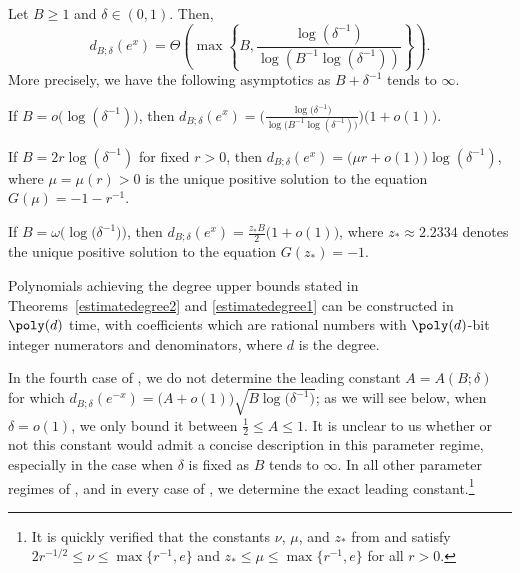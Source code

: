 \begin{theorem} 

\label{estimatedegree1}

Let $B \ge 1$ and $\delta \in (0, 1)$. Then,
$$d_{B; \delta} (e^{x}) = \Theta\left( \max \left\{ B, \frac{\log(\delta^{-1}) }{ \log(B^{-1} \log(\delta^{-1}))} \right\}\right).$$ More precisely, we have the following asymptotics as $B + \delta^{-1}$ tends to $\infty$.

\begin{enumerate}


{\item If $B = o \big( \log ( \delta^{-1}) \big)$, then $d_{B; \delta} (e^x)  =  \bigg( \displaystyle\frac{\log \big( \delta^{-1} \big)}{\log \big( B^{-1} \log (\delta^{-1}) \big)} \bigg) \big( 1 + o (1) \big)$.}

{\item If $B = 2 r \log ( \delta^{-1})$ for fixed $r > 0$, then $d_{B; \delta} (e^x) = \big( \mu r + o(1) \big) \log (\delta^{-1})$, where $\mu = \mu (r) > 0$ is the unique positive solution to the equation $G (\mu) = -1 - r^{-1}$.}


{\item If $B = \omega \big( \log \big( \delta^{-1}) \big)$, then $d_{B; \delta} (e^x)  = \displaystyle\frac{z_*B}{2} \big( 1 + o(1) \big)$, where $z_* \approx 2.2334$ denotes the unique positive solution to the equation $G (z_*) = -1$.}

\end{enumerate}

\end{theorem} 




\begin{remark}
Polynomials achieving the degree upper bounds stated in Theorems~\ref{estimatedegree2} and \ref{estimatedegree1} can be constructed in $\poly(d)$ time, with coefficients which are rational numbers with $\poly(d)$-bit integer numerators and denominators, where $d$ is the degree.
\end{remark}

\begin{remark} \label{rem6}

In the fourth case of , we do not determine the leading constant $A = A(B; \delta)$ for which $d_{B; \delta} (e^{-x}) = \big( A + o(1) \big) \sqrt{B \log \big( \delta^{-1} \big)}$; as we will see below, when $\delta = o(1)$, we only bound it between $\frac{1}{2} \leq A \leq 1$. It is unclear to us whether or not this constant would admit a concise description in this parameter regime, especially in the case when $\delta$ is fixed as $B$ tends to $\infty$. 
In all other parameter regimes of , and in every case of , we determine the exact leading constant.\footnote{It is quickly verified that the constants $\nu$, $\mu$, and $z_*$ from  and  satisfy $2r^{-1/2} \le \nu \le \max \big\{ r^{-1}, e \big\}$ and $z_* \le \mu \le \max \big\{ r^{-1}, e \big\}$ for all $r>0$.}

\end{remark} 

